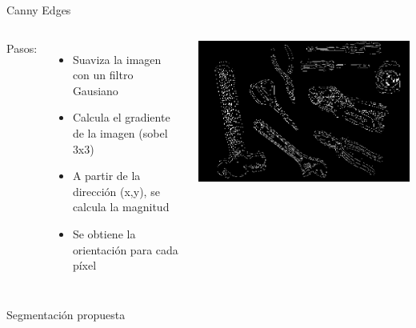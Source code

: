 \documentclass[
  24pt, %
]{beamer}
\begin{document}
\begin{frame}{Canny Edges}
  \begin{columns}
    Pasos:
    \begin{itemize}
    \item Suaviza la imagen con un filtro Gausiano
    \item Calcula el gradiente de la imagen (sobel 3x3)
    \item A partir de la dirección (x,y), se calcula la magnitud
    \item Se obtiene la orientación para cada píxel
    \end{itemize}
    \includegraphics[width=\textwidth]{canny}
  \end{columns}
\end{frame}

\begin{frame}{Segmentación propuesta}
  \centering
\end{frame}
\end{document}
